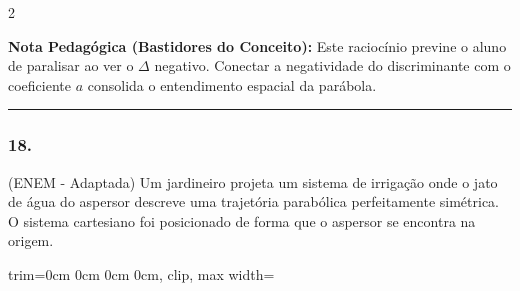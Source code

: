 \begin{multicols*}{2}
    \begin{boxexplicacao}
    \textbf{Nota Pedagógica (Bastidores do Conceito):} Este raciocínio previne o aluno de paralisar ao ver o $\Delta$ negativo. Conectar a negatividade do discriminante com o coeficiente $a$ consolida o entendimento espacial da parábola.
    \end{boxexplicacao}
\fi

\par\vspace{\espacoQuestao}

\noindent\textcolor{CorLinha}{\rule{\linewidth}{0.5pt}} 
\par\vspace{\espacoPreQuestao}
\subsubsection*{18.} 
\begin{enunciadoLiteral}
(ENEM - Adaptada) Um jardineiro projeta um sistema de irrigação onde o jato de água do aspersor descreve uma trajetória parabólica perfeitamente simétrica. O sistema cartesiano foi posicionado de forma que o aspersor se encontra na origem.

\begin{center}
\begin{adjustbox}{trim=0cm 0cm 0cm 0cm, clip, max width=\larguraTikz}
\end{adjustbox}
\end{center}


\end{enunciadoLiteral}
\end{multicols*}
